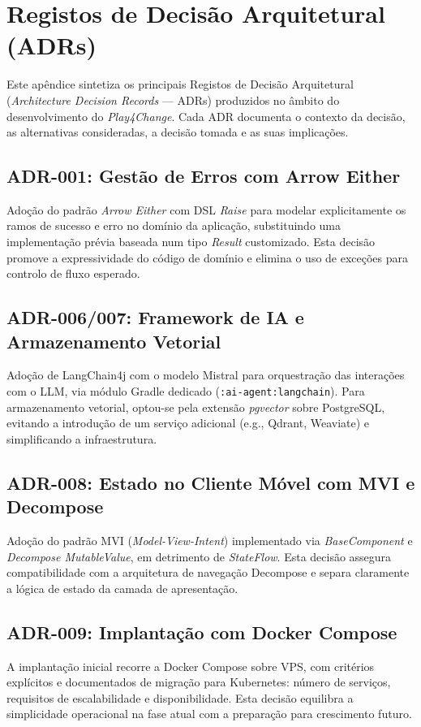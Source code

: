 %
%
\chapter{Registos de Decisão Arquitetural (ADRs)}
\label{cha:adrs}

Este apêndice sintetiza os principais Registos de Decisão Arquitetural (\textit{Architecture Decision Records} --- ADRs) produzidos no âmbito do desenvolvimento do \textit{Play4Change}. Cada ADR documenta o contexto da decisão, as alternativas consideradas, a decisão tomada e as suas implicações.

\section*{ADR-001: Gestão de Erros com Arrow Either}
Adoção do padrão \textit{Arrow Either} com DSL \textit{Raise} para modelar explicitamente os ramos de sucesso e erro no domínio da aplicação, substituindo uma implementação prévia baseada num tipo \textit{Result} customizado. Esta decisão promove a expressividade do código de domínio e elimina o uso de exceções para controlo de fluxo esperado.

\section*{ADR-006/007: Framework de IA e Armazenamento Vetorial}
Adoção de LangChain4j com o modelo Mistral para orquestração das interações com o LLM, via módulo Gradle dedicado (\texttt{:ai-agent:langchain}). Para armazenamento vetorial, optou-se pela extensão \textit{pgvector} sobre PostgreSQL, evitando a introdução de um serviço adicional (e.g., Qdrant, Weaviate) e simplificando a infraestrutura.

\section*{ADR-008: Estado no Cliente Móvel com MVI e Decompose}
Adoção do padrão MVI (\textit{Model-View-Intent}) implementado via \textit{BaseComponent} e \textit{Decompose MutableValue}, em detrimento de \textit{StateFlow}. Esta decisão assegura compatibilidade com a arquitetura de navegação Decompose e separa claramente a lógica de estado da camada de apresentação.

\section*{ADR-009: Implantação com Docker Compose}
A implantação inicial recorre a Docker Compose sobre VPS, com critérios explícitos e documentados de migração para Kubernetes: número de serviços, requisitos de escalabilidade e disponibilidade. Esta decisão equilibra a simplicidade operacional na fase atual com a preparação para crescimento futuro.

